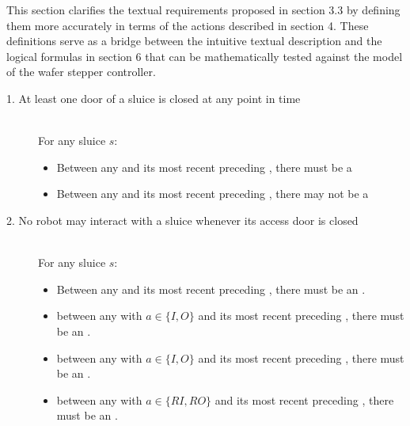 \cbstart
This section clarifies the textual requirements proposed in section 3.3 by defining them more accurately in terms of the actions described in section 4. These definitions serve as a bridge between the intuitive textual description and the logical formulas in section 6 that can be mathematically tested against the model of the wafer stepper controller. \cbend

\begin{description}
 \item[1. At least one door of a sluice is closed at any point in time] \hfill \\
 For any sluice $s$:
 \begin{itemize}
  \item Between any  and its most recent preceding , there must be a 
  \item Between any  and its most recent preceding , there may not be a 
 \end{itemize}

 \item[2. No robot may interact with a sluice whenever its access door is closed] \hfill \\
For any sluice $s$:

\begin{itemize}
	\item Between any  and its most recent preceding , there must be an .
	\item between any  with $a \in \{ I, O \}$ and its most recent preceding , there must be an .
	\item between any  with $a \in \{ I, O \}$ and its most recent preceding , there must be an .
	\item between any  with $a \in \{ RI, RO \}$ and its most recent preceding , there must be an .
\end{itemize}
 
 \cbstart
 \item[] \hfill 
 

\end{description}
